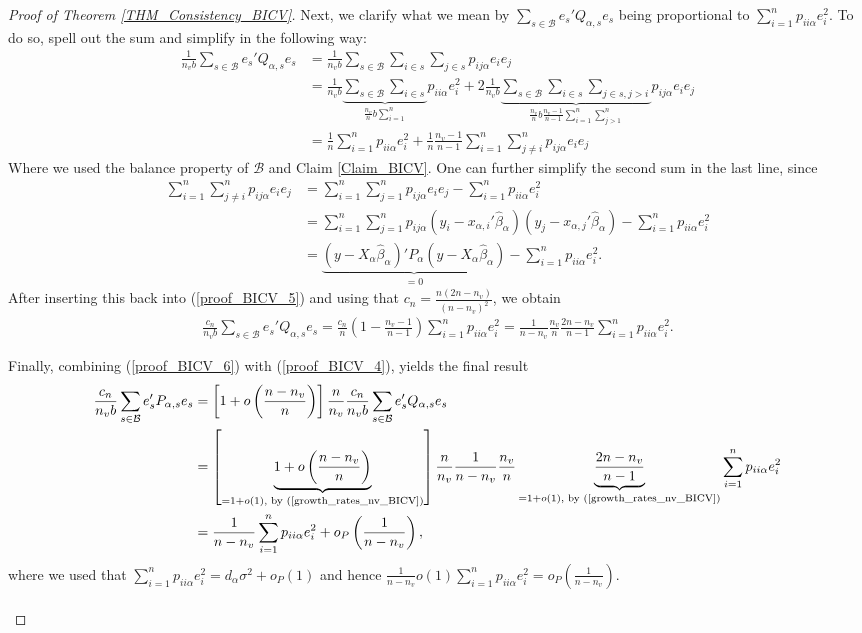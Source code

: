 \documentclass[Research_Module_ES.tex]{subfiles}
\begin{document}
\begin{proof}[Proof of Theorem \ref{THM_Consistency_BICV}]
	Next, we clarify what we mean by $\sum_{s\in \mathcal{B}}e_s'Q_{\alpha,s}e_s$ being proportional to $\sum_{i=1}^np_{ii\alpha}e_i^2$. To do so, spell out the sum and simplify in the following way:
	\begin{align}
	\frac{1}{n_vb}\sum_{s\in \mathcal{B}}e_s'Q_{\alpha,s}e_s
	&= \frac{1}{n_vb}\sum_{s\in \mathcal{B}}\sum_{i\in s}\sum_{j\in s}p_{ij\alpha}e_ie_j\nonumber\\
	&=\frac{1}{n_vb}\underbrace{\sum_{s\in \mathcal{B}} \sum_{i\in s}}_{\frac{n_v}{n}b\sum_{i=1}^n} p_{ii\alpha}e_i^2 
	+ 2\frac{1}{n_vb}\underbrace{\sum_{s\in \mathcal{B}} \sum_{i\in s}\sum_{j\in s, j>i }}_{\frac{n_v}{n}
	b\frac{n_v-1}{n-1}\sum_{i=1}^n\sum_{j>1}^n} p_{ij\alpha}e_ie_j\nonumber\\
	&=\frac{1}{n}\sum_{i=1}^np_{ii\alpha}e_i^2 + \frac{1}{n}\frac{n_v-1}{n-1}\sum_{i=1}^n\sum_{j\neq i}^np_{ij\alpha}e_ie_j\label{proof_BICV_5}
	\end{align}
	Where we used the balance property of $\mathcal{B}$ and Claim \ref{Claim_BICV}. 
	One can further simplify the second sum in the last line, since
	\begin{align*}
	\sum_{i=1}^n\sum_{j\neq i}^np_{ij\alpha}e_ie_j 
	&= \sum_{i=1}^n\sum_{j=1}^np_{ij\alpha}e_ie_j - \sum_{i=1}^np_{ii\alpha}e_i^2\\
	&= \sum_{i=1}^n\sum_{j=1}^np_{ij\alpha}(y_i-x_{\alpha,i}'\hat{\beta}_\alpha)(y_j-x_{\alpha,j}'\hat{\beta}_\alpha) - \sum_{i=1}^np_{ii\alpha}e_i^2\\
	&=\underbrace{(y-X_\alpha\hat{\beta}_\alpha)'P_\alpha(y-X_\alpha\hat{\beta}_\alpha)}_{=0} - \sum_{i=1}^np_{ii\alpha}e_i^2.
	\end{align*}
	After inserting this back into (\ref{proof_BICV_5}) and using that $c_n=\frac{n(2n-n_v)}{(n-n_v)^2}$, we obtain
	\begin{align}
	\frac{c_n}{n_vb}\sum_{s\in \mathcal{B}}e_s'Q_{\alpha,s}e_s 
	= \frac{c_n}{n}\left(1-\frac{n_v-1}{n-1}\right)\sum_{i=1}^np_{ii\alpha}e_i^2
	= \frac{1}{n-n_v}\frac{n_v}{n}\frac{2n-n_v}{n-1}\sum_{i=1}^np_{ii\alpha}e_i^2.\label{proof_BICV_6}
	\end{align}
	
	Finally, combining (\ref{proof_BICV_6}) with (\ref{proof_BICV_4}), yields the final result
	\begin{align*}
	\frac{c_n}{n_vb}\sum_{s\in \mathcal{B}}e_s'P_{\alpha,s}e_s
	&=\left[1+o\left(\frac{n-n_v}{n}\right)\right]\frac{n}{n_v}\frac{c_n}{n_vb}\sum_{s\in \mathcal{B}}e_s'Q_{\alpha,s}e_s\\
	&=\left[\underbrace{1+o\left(\frac{n-n_v}{n}\right)}_{=1+o(1)\textrm{, by (\ref{growth_rates_nv_BICV})}}\right]\frac{n}{n_v}\frac{1}{n-n_v}\frac{n_v}{n}\underbrace{\frac{2n-n_v}{n-1}}_{=1+o(1)\textrm{, by (\ref{growth_rates_nv_BICV})}}\sum_{i=1}^np_{ii\alpha}e_i^2\\
	&=\frac{1}{n-n_v}\sum_{i=1}^np_{ii\alpha}e_i^2 + o_P\left(\frac{1}{n-n_v}\right),
	\end{align*}
	where we used that $\sum_{i=1}^np_{ii\alpha}e_i^2=d_\alpha\sigma^2+o_P(1)$ and hence $\frac{1}{n-n_v}o(1)\sum_{i=1}^np_{ii\alpha}e_i^2=o_P(\frac{1}{n-n_v})$.\\\\
	

\end{proof}
\end{document}
